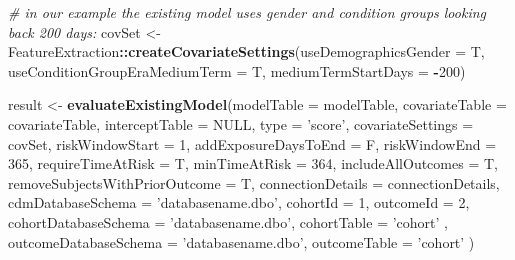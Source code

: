 \documentclass[]{article}
\newenvironment{Shaded}{\begin{snugshade}}{\end{snugshade}}
\newcommand{\KeywordTok}[1]{\textcolor[rgb]{0.13,0.29,0.53}{\textbf{#1}}}
\newcommand{\DataTypeTok}[1]{\textcolor[rgb]{0.13,0.29,0.53}{#1}}
\newcommand{\DecValTok}[1]{\textcolor[rgb]{0.00,0.00,0.81}{#1}}
\newcommand{\StringTok}[1]{\textcolor[rgb]{0.31,0.60,0.02}{#1}}
\newcommand{\CommentTok}[1]{\textcolor[rgb]{0.56,0.35,0.01}{\textit{#1}}}
\newcommand{\OtherTok}[1]{\textcolor[rgb]{0.56,0.35,0.01}{#1}}
\newcommand{\OperatorTok}[1]{\textcolor[rgb]{0.81,0.36,0.00}{\textbf{#1}}}
\newcommand{\NormalTok}[1]{#1}
\begin{document}
\begin{Shaded}
\begin{Highlighting}[]
\CommentTok{# in our example the existing model uses gender and condition groups looking back 200 days:}
\NormalTok{covSet <-}\StringTok{ }\NormalTok{FeatureExtraction}\OperatorTok{::}\KeywordTok{createCovariateSettings}\NormalTok{(}\DataTypeTok{useDemographicsGender =}\NormalTok{ T,}
                                                     \DataTypeTok{useConditionGroupEraMediumTerm =}\NormalTok{ T, }
                                                     \DataTypeTok{mediumTermStartDays =} \OperatorTok{-}\DecValTok{200}\NormalTok{)}

\NormalTok{result <-}\StringTok{ }\KeywordTok{evaluateExistingModel}\NormalTok{(}\DataTypeTok{modelTable =}\NormalTok{ modelTable,}
                                \DataTypeTok{covariateTable =}\NormalTok{ covariateTable,}
                                \DataTypeTok{interceptTable =} \OtherTok{NULL}\NormalTok{,}
                                \DataTypeTok{type =} \StringTok{'score'}\NormalTok{, }
                                \DataTypeTok{covariateSettings =}\NormalTok{  covSet,}
                                \DataTypeTok{riskWindowStart =} \DecValTok{1}\NormalTok{, }
                                \DataTypeTok{addExposureDaysToEnd =}\NormalTok{ F, }
                                \DataTypeTok{riskWindowEnd =} \DecValTok{365}\NormalTok{, }
                                \DataTypeTok{requireTimeAtRisk =}\NormalTok{ T, }
                                \DataTypeTok{minTimeAtRisk =} \DecValTok{364}\NormalTok{, }
                                \DataTypeTok{includeAllOutcomes =}\NormalTok{ T, }
                                \DataTypeTok{removeSubjectsWithPriorOutcome =}\NormalTok{ T, }
                                \DataTypeTok{connectionDetails =}\NormalTok{ connectionDetails, }
                                \DataTypeTok{cdmDatabaseSchema =} \StringTok{'databasename.dbo'}\NormalTok{,}
                                \DataTypeTok{cohortId =} \DecValTok{1}\NormalTok{,}
                                \DataTypeTok{outcomeId =} \DecValTok{2}\NormalTok{, }
                                \DataTypeTok{cohortDatabaseSchema =} \StringTok{'databasename.dbo'}\NormalTok{, }
                                \DataTypeTok{cohortTable =}  \StringTok{'cohort'}\NormalTok{ , }
                                \DataTypeTok{outcomeDatabaseSchema =} \StringTok{'databasename.dbo'}\NormalTok{, }
                                \DataTypeTok{outcomeTable =} \StringTok{'cohort'}
\NormalTok{                      )}
\end{Highlighting}
\end{Shaded}
\end{document}
